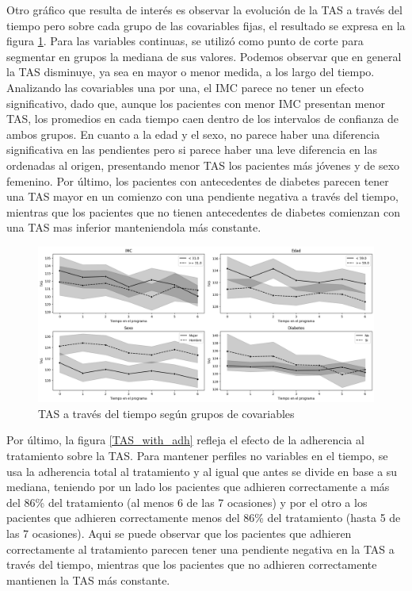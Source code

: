 \documentclass[spanish]{article}
\numberwithin{figure}{subsection}
\numberwithin{equation}{subsection}
\numberwithin{table}{subsection}
\begin{document}
Otro gráfico que resulta de interés es observar la evolución de la TAS a través
del tiempo pero sobre cada grupo de las covariables fijas, el resultado se
expresa en la figura \ref{TAS_with_covs}. Para las variables continuas, se
utilizó como punto de corte para segmentar en grupos la mediana de sus valores.
Podemos observar que en general la TAS disminuye, ya sea en mayor o menor
medida, a los largo del tiempo. Analizando las covariables una por una, el IMC
parece no tener un efecto significativo, dado que, aunque los pacientes con
menor IMC presentan menor TAS, los promedios en cada tiempo caen dentro de los
intervalos de confianza de ambos grupos. En cuanto a la edad y el sexo, no
parece haber una diferencia significativa en las pendientes pero si parece haber
una leve diferencia en las ordenadas al origen, presentando menor TAS los
pacientes más jóvenes y de sexo femenino. Por último, los pacientes con
antecedentes de diabetes parecen tener una TAS mayor en un comienzo con una
pendiente negativa a través del tiempo, mientras que los pacientes que no tienen
antecedentes de diabetes comienzan con una TAS mas inferior manteniendola más
constante.

\begin{figure}[H]
	\centering
	\includegraphics[scale=0.4]{img/TAS_vs_tpo_with_covs.png}
	\caption{TAS a través del tiempo según grupos de covariables}
	\label{TAS_with_covs}
\end{figure}

Por último, la figura \ref{TAS_with_adh} refleja el efecto de la adherencia al
tratamiento sobre la TAS. Para mantener perfiles no variables en el tiempo, se
usa la adherencia total al tratamiento y al igual que antes se divide en base a
su mediana, teniendo por un lado los pacientes que adhieren correctamente a más
del 86\% del tratamiento (al menos 6 de las 7 ocasiones) y por el otro a los
pacientes que adhieren correctamente menos del 86\% del tratamiento (hasta 5 de
las 7 ocasiones). Aqui se puede observar que los pacientes que adhieren
correctamente al tratamiento parecen tener una pendiente negativa en la TAS a
través del tiempo, mientras que los pacientes que no adhieren correctamente
mantienen la TAS más constante.
\end{document}
